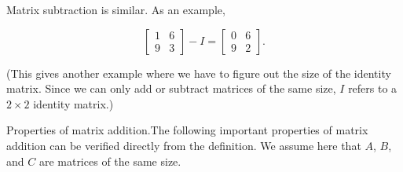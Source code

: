 Matrix subtraction is similar. As an example,

\[\left[\begin{array}{cc}1&6\\ 9&3\end{array}\right]-I=\left[\begin{array}{cc}0&6\\ 9&2\end{array}\right].\]

(This gives another example where we have to figure out the size of the identity matrix. Since we can only add or subtract matrices of the same size, \(I\) refers to a \(2\times 2\) identity matrix.)

Properties of matrix addition.The following important properties of matrix addition can be verified directly from the definition. We assume here that \(A\), \(B\), and \(C\) are matrices of the same size.

